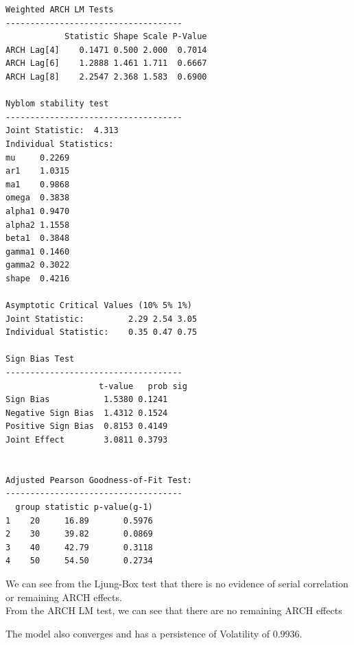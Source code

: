 \documentclass{article}
\begin{document}
\begin{verbatim}
Weighted ARCH LM Tests
------------------------------------
            Statistic Shape Scale P-Value
ARCH Lag[4]    0.1471 0.500 2.000  0.7014
ARCH Lag[6]    1.2888 1.461 1.711  0.6667
ARCH Lag[8]    2.2547 2.368 1.583  0.6900

Nyblom stability test
------------------------------------
Joint Statistic:  4.313
Individual Statistics:             
mu     0.2269
ar1    1.0315
ma1    0.9868
omega  0.3838
alpha1 0.9470
alpha2 1.1558
beta1  0.3848
gamma1 0.1460
gamma2 0.3022
shape  0.4216

Asymptotic Critical Values (10% 5% 1%)
Joint Statistic:     	 2.29 2.54 3.05
Individual Statistic:	 0.35 0.47 0.75

Sign Bias Test
------------------------------------
                   t-value   prob sig
Sign Bias           1.5380 0.1241    
Negative Sign Bias  1.4312 0.1524    
Positive Sign Bias  0.8153 0.4149    
Joint Effect        3.0811 0.3793    


Adjusted Pearson Goodness-of-Fit Test:
------------------------------------
  group statistic p-value(g-1)
1    20     16.89       0.5976
2    30     39.82       0.0869
3    40     42.79       0.3118
4    50     54.50       0.2734
\end{verbatim}

\noindent We can see from the Ljung-Box test that there is no evidence of serial correlation or remaining ARCH effects. \\

\noindent From the ARCH LM test, we can see that there are no remaining ARCH effects

\noindent The model also converges and has a persistence of Volatility of $0.9936$.

\clearpage
\end{document}
